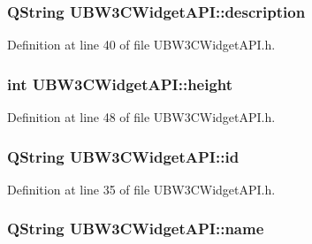 \hypertarget{class_u_b_w3_c_widget_a_p_i_ab69c675b3b74d6b9c7368bd7ea3001bf}{
\subsubsection[{description}]{\setlength{\rightskip}{0pt plus 5cm}Q\-String U\-B\-W3\-C\-Widget\-A\-P\-I\-::description\hspace{0.3cm}{\ttfamily [read]}}}\label{da/d8c/class_u_b_w3_c_widget_a_p_i_ab69c675b3b74d6b9c7368bd7ea3001bf}


Definition at line 40 of file U\-B\-W3\-C\-Widget\-A\-P\-I.\-h.

\hypertarget{class_u_b_w3_c_widget_a_p_i_a66aaac9c6134b1a349652a8150601ff5}{
\subsubsection[{height}]{\setlength{\rightskip}{0pt plus 5cm}int U\-B\-W3\-C\-Widget\-A\-P\-I\-::height\hspace{0.3cm}{\ttfamily [read]}}}\label{da/d8c/class_u_b_w3_c_widget_a_p_i_a66aaac9c6134b1a349652a8150601ff5}


Definition at line 48 of file U\-B\-W3\-C\-Widget\-A\-P\-I.\-h.

\hypertarget{class_u_b_w3_c_widget_a_p_i_a9205ba93f7a146a20e0e1c5f7da6e842}{
\subsubsection[{id}]{\setlength{\rightskip}{0pt plus 5cm}Q\-String U\-B\-W3\-C\-Widget\-A\-P\-I\-::id\hspace{0.3cm}{\ttfamily [read]}}}\label{da/d8c/class_u_b_w3_c_widget_a_p_i_a9205ba93f7a146a20e0e1c5f7da6e842}


Definition at line 35 of file U\-B\-W3\-C\-Widget\-A\-P\-I.\-h.

\hypertarget{class_u_b_w3_c_widget_a_p_i_a1e3515e5ad4b3b38c75880733b9bbd47}{
\subsubsection[{name}]{\setlength{\rightskip}{0pt plus 5cm}Q\-String U\-B\-W3\-C\-Widget\-A\-P\-I\-::name\hspace{0.3cm}{\ttfamily [read]}}}\label{da/d8c/class_u_b_w3_c_widget_a_p_i_a1e3515e5ad4b3b38c75880733b9bbd47}


